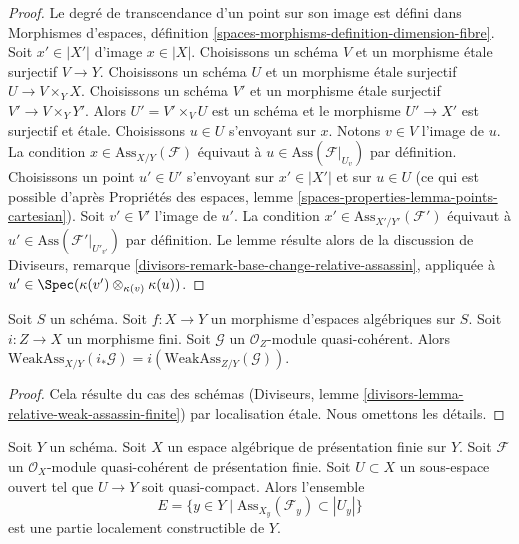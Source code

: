 \begin{proof}
Le degré de transcendance d'un point sur son image est défini dans
Morphismes d'espaces, définition
\ref{spaces-morphisms-definition-dimension-fibre}.
Soit $x' \in |X'|$ d'image $x \in |X|$.
Choisissons un schéma $V$ et un morphisme \'etale surjectif $V \to Y$.
Choisissons un schéma $U$ et un morphisme
\'etale surjectif $U \to V \times_Y X$. Choisissons un schéma $V'$
et un morphisme \'etale surjectif $V' \to V \times_Y Y'$.
Alors $U' = V' \times_V U$ est un schéma et le morphisme
$U' \to X'$ est surjectif et \'etale.
Choisissons $u \in U$ s'envoyant sur $x$.
Notons $v \in V$ l'image de $u$.
La condition $x \in \text{Ass}_{X/Y}(\mathcal{F})$ équivaut
à $u \in \text{Ass}(\mathcal{F}|_{U_v})$
par définition. Choisissons un point $u' \in U'$ s'envoyant
sur $x' \in |X'|$ et sur $u \in U$ (ce qui est possible d'après
Propriétés des espaces, lemme \ref{spaces-properties-lemma-points-cartesian}).
Soit $v' \in V'$ l'image de $u'$.
La condition $x' \in \text{Ass}_{X'/Y'}(\mathcal{F}')$ équivaut
à $u' \in \text{Ass}(\mathcal{F}'|_{U'_{v'}})$
par définition.
Le lemme résulte alors de la discussion de
Diviseurs, remarque \ref{divisors-remark-base-change-relative-assassin},
appliquée à $u' \in \Spec(\kappa(v') \otimes_{\kappa(v)} \kappa(u))$.
\end{proof}

\begin{lemma}
\label{lemma-relative-weak-assassin-finite}
Soit $S$ un schéma.
Soit $f : X \to Y$ un morphisme d'espaces algébriques sur $S$.
Soit $i : Z \to X$ un morphisme fini.
Soit $\mathcal{G}$ un $\mathcal{O}_Z$-module quasi-cohérent.
Alors $\text{WeakAss}_{X/Y}(i_*\mathcal{G}) =
i(\text{WeakAss}_{Z/Y}(\mathcal{G}))$.
\end{lemma}

\begin{proof}
Cela résulte du cas des schémas
(Diviseurs, lemme \ref{divisors-lemma-relative-weak-assassin-finite})
par localisation \'etale. Nous omettons les détails.
\end{proof}

\begin{lemma}
\label{lemma-relative-assassin-constructible}
Soit $Y$ un schéma. Soit $X$ un espace algébrique de présentation finie
sur $Y$. Soit $\mathcal{F}$ un $\mathcal{O}_X$-module quasi-cohérent
de présentation finie. Soit $U \subset X$ un sous-espace ouvert
tel que $U \to Y$ soit quasi-compact. Alors l'ensemble
$$
E = \{y \in Y \mid \text{Ass}_{X_y}(\mathcal{F}_y) \subset |U_y|\}
$$
est une partie localement constructible de $Y$.
\end{lemma}

